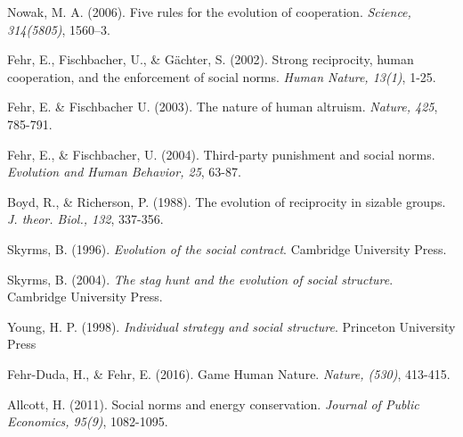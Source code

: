 \documentclass[rutwik_proposal.tex]{subfiles}
\begin{document}
\begin{thebibliography}{100}
Nowak, M. A. 
(2006). 
Five rules for the evolution of cooperation. 
\emph{Science, 314(5805)}, 
1560–3.

Fehr, E., Fischbacher, U., \& G\"achter, S.
(2002).
Strong reciprocity, human cooperation, and the enforcement of social norms.
\emph{Human Nature, 13(1)},
1-25.

Fehr, E. \& Fischbacher U.
(2003).
The nature of human altruism.
\emph{Nature, 425},
785-791.

Fehr, E., \& Fischbacher, U.
(2004).
Third-party punishment and social norms.
\emph{Evolution and Human Behavior, 25},
63-87.

Boyd, R., \& Richerson, P.
(1988).
The evolution of reciprocity in sizable groups.
\emph{J. theor. Biol., 132},
337-356.

Skyrms, B.
(1996).
\emph{Evolution of the social contract}.
Cambridge University Press.

Skyrms, B.
(2004).
\emph{The stag hunt and the evolution of social structure}.
Cambridge University Press.

Young, H. P.
(1998).
\emph{Individual strategy and social structure}.
Princeton University Press

Fehr-Duda, H., \& Fehr, E. 
(2016). 
Game Human Nature.
\emph{Nature, (530)},
413-415.

Allcott, H. 
(2011). 
Social norms and energy conservation. 
\emph{Journal of Public Economics, 95(9)}, 
1082-1095.

\end{thebibliography}
\end{document}
